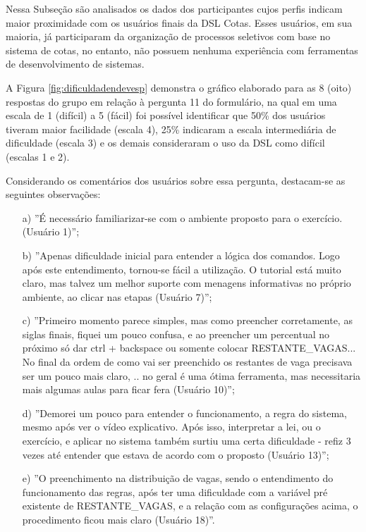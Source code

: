 Nessa Subseção são analisados os dados dos participantes cujos perfis indicam maior proximidade com os usuários finais da DSL Cotas. Esses usuários, em sua maioria, já participaram da organização de processos seletivos com base no sistema de cotas, no entanto, não possuem nenhuma experiência com ferramentas de desenvolvimento de sistemas.

A Figura \ref{fig:dificuldadendevesp} demonstra o gráfico elaborado para as 8 (oito) respostas do grupo em relação à pergunta 11 do formulário, na qual em uma escala de 1 (difícil) a 5 (fácil) foi possível identificar que 50\% dos usuários tiveram maior facilidade (escala 4), 25\% indicaram a escala intermediária de dificuldade (escala 3) e os demais consideraram o uso da DSL como difícil (escalas 1 e 2). 



\newpage
Considerando os comentários dos usuários sobre essa pergunta, destacam-se as seguintes observações:

\begin{enumerate}
    \item [a)] ''É necessário familiarizar-se com o ambiente proposto para o exercício. (Usuário 1)'';
    
    \item [b)] ''Apenas dificuldade inicial para entender a lógica dos comandos. Logo após este entendimento, tornou-se fácil a utilização. O tutorial está muito claro, mas talvez um melhor suporte com menagens informativas no próprio ambiente, ao clicar nas etapas (Usuário 7)'';
    
    \item [c)] ''Primeiro momento parece simples, mas como preencher corretamente, as siglas finais, fiquei um pouco confusa, e ao preencher um percentual no próximo só dar ctrl + backspace ou somente colocar RESTANTE\_VAGAS... No final da ordem de como vai ser preenchido os restantes de vaga precisava ser um pouco mais claro, .. no geral é uma ótima ferramenta, mas necessitaria mais algumas aulas para ficar fera (Usuário 10)'';
    
    \item [d)] ''Demorei um pouco para entender o funcionamento, a regra do sistema, mesmo após ver o vídeo explicativo. Após isso, interpretar a lei, ou o exercício, e aplicar no sistema também surtiu uma certa dificuldade - refiz 3 vezes até entender que estava de acordo com o proposto (Usuário 13)'';
    
    \item[e)] ''O preenchimento na distribuição de vagas, sendo o entendimento do funcionamento das regras, após ter uma dificuldade com a variável pré existente de RESTANTE\_VAGAS, e a relação com as configurações acima, o procedimento ficou mais claro (Usuário 18)''.
\end{enumerate}

